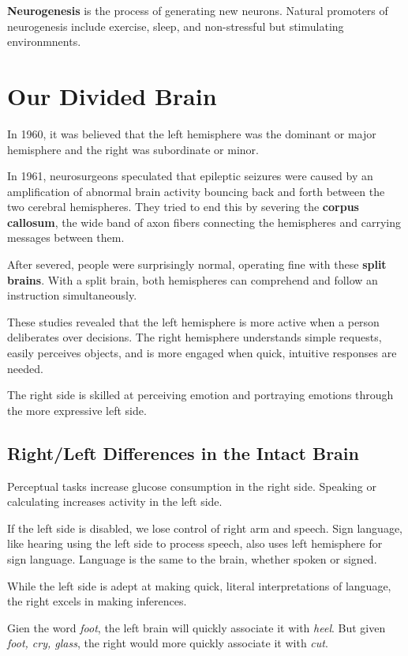 \documentclass[12pt]{article}
\begin{document}
\textbf{Neurogenesis} is the process of generating new neurons. Natural promoters of neurogenesis include exercise, sleep, and non-stressful but stimulating environmnents.

\section*{Our Divided Brain}
In 1960, it was believed that the left hemisphere was the dominant or major hemisphere and the right was subordinate or minor.

In 1961, neurosurgeons speculated that epileptic seizures were caused by an amplification of abnormal brain activity bouncing back and forth between the two cerebral hemispheres. They tried to end this by severing the \textbf{corpus callosum}, the wide band of axon fibers connecting the hemispheres and carrying messages between them.

After severed, people were surprisingly normal, operating fine with these \textbf{split brains}. With a split brain, both hemispheres can comprehend and follow an instruction simultaneously.

These studies revealed that the left hemisphere is more active when a person deliberates over decisions. The right hemisphere understands simple requests, easily perceives objects, and is more engaged when quick, intuitive responses are needed.

The right side is skilled at perceiving emotion and portraying emotions through the more expressive left side.

\subsection*{Right/Left Differences in the Intact Brain}
Perceptual tasks increase glucose consumption in the right side. Speaking or calculating increases activity in the left side.

If the left side is disabled, we lose control of right arm and speech. Sign language, like hearing using the left side to process speech, also uses left hemisphere for sign language. Language is the same to the brain, whether spoken or signed.

While the left side is adept at making quick, literal interpretations of language, the right excels in making inferences.

Gien the word {\it foot}, the left brain will quickly associate it with {\it heel}. But given {\it foot, cry, glass}, the right would more quickly associate it with {\it cut}.
\end{document}
